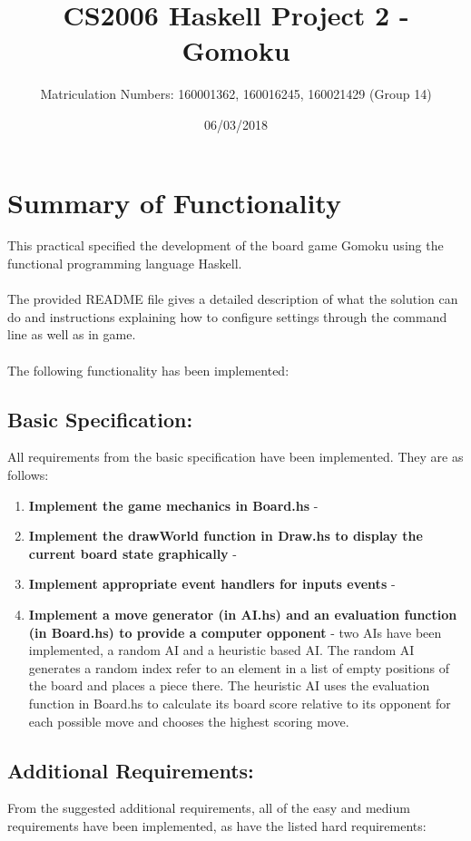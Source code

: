 \documentclass[11]{article}
\title{CS2006 Haskell Project 2 - \\ Gomoku}
\date{06/03/2018}
\author{Matriculation Numbers: 160001362, 160016245, 160021429 (Group 14)}
\begin{document}
	\maketitle
	\newpage
	\tableofcontents
	
	\newpage
	\section{Summary of Functionality}
		This practical specified the development of the board game Gomoku using the functional programming language Haskell. \\\\The provided README file gives a detailed description of what the solution can do and instructions explaining how to configure settings through the command line as well as in game.
\\\\The following functionality has been implemented:
	\subsection{Basic Specification:}
		All requirements from the basic specification have been implemented. They are as follows:	
		\begin{enumerate}
			\item \textbf{Implement the game mechanics in Board.hs} -
			\item \textbf{Implement the drawWorld function in Draw.hs to display the current board state graphically} -
			\item \textbf{Implement appropriate event handlers for inputs events} -
			\item \textbf{Implement a move generator (in AI.hs) and an evaluation function (in Board.hs) to provide a computer opponent} - two AIs have been implemented, a random AI and a heuristic based AI. The random AI generates a random index refer to an element in a list of empty positions of the board and places a piece there. The heuristic AI uses the evaluation function in Board.hs to calculate its board score relative to its opponent for each possible move and chooses the highest scoring move.
		\end{enumerate}
	
	\subsection{Additional Requirements:}
	 From the suggested additional requirements, all of the easy and medium requirements have been implemented, as have the listed hard requirements:
\end{document}
